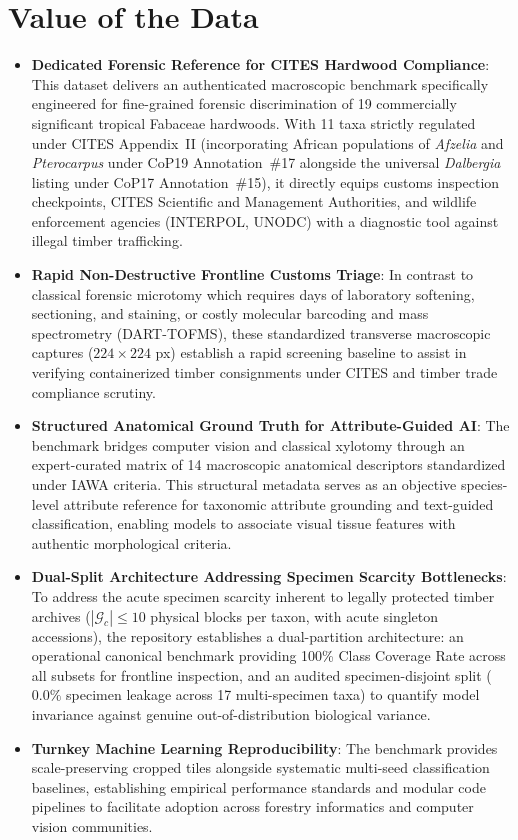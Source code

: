 \documentclass[a4paper,fleqn,12pt]{cas-sc}
\begin{document}
\vspace{0.8em}

\section{Value of the Data}
\label{sec:value}

\begin{itemize}[leftmargin=*,itemsep=3pt,topsep=2pt]
    \item \textbf{Dedicated Forensic Reference for CITES Hardwood Compliance}: This dataset delivers an authenticated macroscopic benchmark specifically engineered for fine-grained forensic discrimination of 19 commercially significant tropical Fabaceae hardwoods. With 11 taxa strictly regulated under CITES Appendix~II (incorporating African populations of \textit{Afzelia} and \textit{Pterocarpus} under CoP19 Annotation~\#17 alongside the universal \textit{Dalbergia} listing under CoP17 Annotation~\#15), it directly equips customs inspection checkpoints, CITES Scientific and Management Authorities, and wildlife enforcement agencies (INTERPOL, UNODC) with a diagnostic tool against illegal timber trafficking.
    \item \textbf{Rapid Non-Destructive Frontline Customs Triage}: In contrast to classical forensic microtomy which requires days of laboratory softening, sectioning, and staining, or costly molecular barcoding and mass spectrometry (DART-TOFMS), these standardized transverse macroscopic captures ($224 \times 224$ px) establish a rapid screening baseline to assist in verifying containerized timber consignments under CITES and timber trade compliance scrutiny.
    \item \textbf{Structured Anatomical Ground Truth for Attribute-Guided AI}: The benchmark bridges computer vision and classical xylotomy through an expert-curated matrix of 14 macroscopic anatomical descriptors standardized under IAWA criteria. This structural metadata serves as an objective species-level attribute reference for taxonomic attribute grounding and text-guided classification, enabling models to associate visual tissue features with authentic morphological criteria.
    \item \textbf{Dual-Split Architecture Addressing Specimen Scarcity Bottlenecks}: To address the acute specimen scarcity inherent to legally protected timber archives ($|\mathcal{G}_c| \le 10$ physical blocks per taxon, with acute singleton accessions), the repository establishes a dual-partition architecture: an operational canonical benchmark providing 100\% Class Coverage Rate across all subsets for frontline inspection, and an audited specimen-disjoint split ($0.0\%$ specimen leakage across 17 multi-specimen taxa) to quantify model invariance against genuine out-of-distribution biological variance.
    \item \textbf{Turnkey Machine Learning Reproducibility}: The benchmark provides scale-preserving cropped tiles alongside systematic multi-seed classification baselines, establishing empirical performance standards and modular code pipelines to facilitate adoption across forestry informatics and computer vision communities.
\end{itemize}
\end{document}
